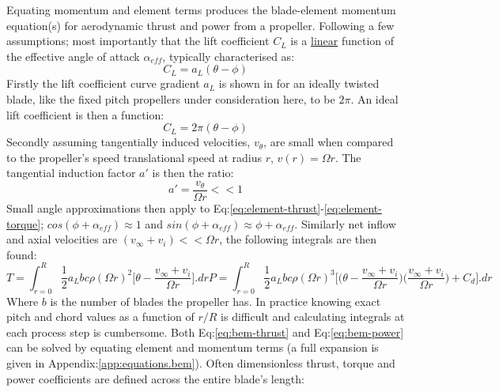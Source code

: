 Equating momentum and element terms produces the blade-element momentum equation(s) for aerodynamic thrust and power from a propeller. Following a few assumptions; most importantly that the lift coefficient $C_L$ is a \underline{linear} function of the effective angle of attack $\alpha_{eff}$, typically characterised as:
\begin{equation}
C_L=a_L(\theta-\phi)
\end{equation}
Firstly the lift coefficient curve gradient $a_L$ is shown in \cite{aerodynamicsforengineering} for an ideally twisted blade, like the fixed pitch propellers under consideration here, to be $2\pi$. An ideal lift coefficient is then a function:
\begin{equation}\label{eq:lift-curve-gradient}
C_L=2\pi(\theta-\phi)
\end{equation}
Secondly assuming tangentially induced velocities, $v_\theta$, are small when compared to the propeller's speed translational speed at radius $r$, $v(r)=\Omega r$. The tangential induction factor $a'$ is then the ratio:
\begin{equation}
a'=\frac{v_\theta}{\Omega r}<<1
\end{equation}
Small angle approximations then apply to Eq:\ref{eq:element-thrust}-\ref{eq:element-torque}; $cos(\phi+\alpha_{eff})\approx 1$ and $sin(\phi+\alpha_{eff})\approx \phi+\alpha_{eff}$. Similarly net inflow and axial velocities are $(v_\infty + v_i)<<\Omega r$, the following integrals are then found:
\begin{subequations}
\begin{equation}\label{eq:bem-thrust}
T=\int_{r=0}^R \frac{1}{2} a_L b c \rho (\Omega r)^2 \bigg[\theta-\frac{v_\infty+v_i}{\Omega r}\bigg].dr
\end{equation}
\begin{equation}\label{eq:bem-power}
P=\int_{r=0}^R \frac{1}{2}a_L b c \rho (\Omega r)^3\bigg[\big(\theta-\frac{v_\infty+v_i}{\Omega r}\big)\big(\frac{v_\infty+v_i}{\Omega r}\big) + C_d\bigg].dr
\end{equation}
\end{subequations}
Where $b$ is the number of blades the propeller has. In practice knowing exact pitch and chord values as a function of $r/R$ is difficult and calculating integrals at each process step is cumbersome. Both Eq:\ref{eq:bem-thrust} and Eq:\ref{eq:bem-power} can be solved by equating element and momentum terms (a full expansion is given in Appendix:\ref{app:equations.bem}). Often dimensionless thrust, torque and power coefficients are defined across the entire blade's length:
